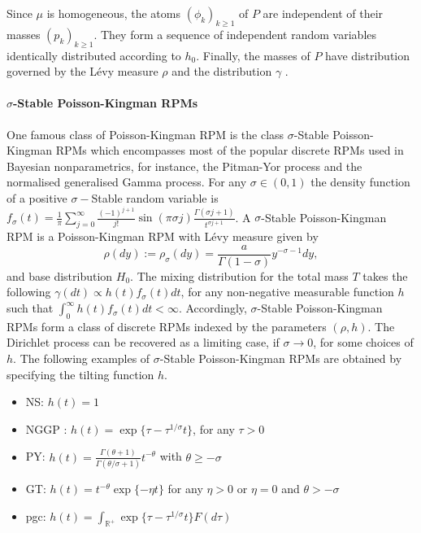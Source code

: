 Since $\mu$ is homogeneous, the atoms $\left(\phi_k \right)_{k \ge 1}$ of $P$ are independent of their masses $\left(p_k \right)_{k \ge 1}$. They form a sequence of independent random variables identically distributed according to $h_0$. Finally, the masses of $P$ have distribution governed by the Lévy measure $\rho$ and the distribution $\gamma$ .

\paragraph{$\sigma$-Stable Poisson-Kingman \glspl{RPM}}
One famous class of Poisson-Kingman \gls{RPM} is the class $\sigma$-Stable Poisson-Kingman \glspl{RPM} which encompasses most of the popular discrete \glspl{RPM} used in Bayesian nonparametrics, for instance, the Pitman-Yor process and the normalised generalised Gamma process.
For any $\sigma \in (0,1)$ the density function of a positive  $\sigma-$Stable random variable is
$f_\sigma(t) = \frac{1}{\pi}\sum_{j=0}^\infty \frac{(-1)^{j+1}}{j!}\sin(\pi\sigma j)\frac{\Gamma(\sigma j+1)}{t^{\sigma j+1}}$. A $\sigma$-Stable Poisson-Kingman \gls{RPM} is a Poisson-Kingman \gls{RPM} with Lévy measure given by
\begin{equation} \label{eq:sigma_stable_PK}
\rho(dy) := \rho_\sigma(dy) = \frac{a}{\Gamma(1 - \sigma)}y^{-\sigma-1} dy,
\end{equation}
and base distribution $H_0$.
The mixing distribution for the total mass $T$ takes the following 
$\gamma(dt) \propto h(t) f_\sigma(t) dt$, for any non-negative measurable function $h$ such that
$\int_0^\infty{h(t)f_\sigma(t) dt} < \infty$.
Accordingly, $\sigma$-Stable Poisson-Kingman \glspl{RPM} form a class of discrete \glspl{RPM} indexed by the parameters $(\rho, h)$. The Dirichlet process can be recovered as a limiting case, if $\sigma \rightarrow 0$, for some choices of $h$. The following examples of $\sigma$-Stable Poisson-Kingman \glspl{RPM}  are obtained by specifying the tilting function $h$.

\begin{itemize}
\item \acrfull{NS}: $h(t) = 1$ \\
\item \acrfull{NGGP} : $h(t) = \exp\{\tau - \tau^{1/\sigma}t \}$, for any $\tau > 0$
\item \acrfull{PY}: $h(t) = \frac{\Gamma(\theta + 1)}{\Gamma(\theta / \sigma + 1)}t^{-\theta}$ with $\theta \ge -\sigma$
\item \acrfull{GT}: $h(t) = t^{-\theta} \exp\{-\eta t\}$ for any $\eta > 0$ or $\eta=0$ and $\theta>-\sigma$
\item \acrfull{pgc}: $h(t) = \int_{\mathbb{R}^+} \exp\{\tau - \tau^{1/\sigma}t \} F(d\tau)$ \\
\end{itemize}

